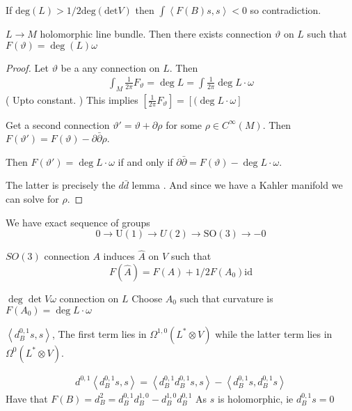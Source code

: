 If $ \mathrm{deg}(L) > 1/2 \mathrm{deg} (\mathrm{det} V)$ then $ \int \left< F(B) s, s \right> < 0 $  so contradiction.

\begin{lemma}
 $ L \rightarrow M $ holomorphic line bundle. 
    Then there exists connection $ \vartheta$ on $ L $ such that $ F(\vartheta) = \deg ( L) \omega $ 
\end{lemma}

\begin{proof} 
    Let $ \vartheta $ be a any connection on $ L $. 
    Then 
    \begin{align}
        \int _M \frac{1}{2 \pi}   F_\vartheta = \deg L = \int \frac{1}{2 \pi } \deg L \cdot \omega 
    \end{align}
    ( Upto constant. )
    This implies $ [ \frac{1}{2 \pi} F_\vartheta] = [ ( \deg L \cdot \omega ]  $ 

    Get a second connection $ \vartheta ' =  \vartheta + \partial \rho $ for some $ \rho  \in C^\infty (M) $. 
    Then $ F(\vartheta' ) = F(\vartheta) - \partial \bar{ \partial} \rho $. 

    Then $ F(\vartheta ' ) = \deg L \cdot \omega $ if and only if 
    $ \partial \bar{\partial } =  F(\vartheta) - \deg L \cdot \omega $. 

    The latter is precisely the $ d \bar{d} $ lemma . 
    And since we have a Kahler manifold we can solve for $\rho$. 
\end{proof}

We have exact sequence of groups 
\begin{equation}
    0 \rightarrow\mathrm{U}(1)  \rightarrow U ( 2) \rightarrow  \mathrm{SO}(3) \rightarrow  -0 
\end{equation}

$SO(3) $ connection $A$ induces $ \hat{A} $ on $V$ such that 
\begin{equation}
    F (\hat{A} ) = F ( A) + 1/2 F( A_0 ) \mathrm{id} 
\end{equation}

$\deg \det V \omega $ 
connection on $L$ 
Choose $A_0 $ such that curvature is $ F(A_0 )  = \deg L \cdot \omega $ 

$ \left< d_B ^{0,1} s, s \right> $, 
The first term lies in $ \Omega^{1,0} ( L^* \otimes V ) $ while the latter term lies in $ \Omega^{0} ( L^* \otimes V ) $.

\begin{align}
   d^{0,1}  \left< d_B ^{0,1} s, s \right> = \left<  d_B ^{0,1} d_B ^{0,1} s , s \right> - \left< d_B ^{0,1} s ,  d_B ^{0,1} s \right> 
\end{align}
Have that $ F(B) = d^2 _B =  d_B ^{0,1} d_B ^{1,0} - d_B ^{1,0} d_B ^{0,1} $
As $s$ is holomorphic, ie $ d_B ^{0,1} s = 0 $

